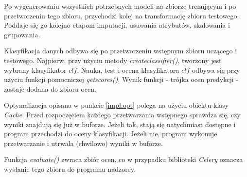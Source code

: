 \documentclass[../thesis.tex]{subfiles}
\begin{document}
Po wygenerowaniu wszystkich potrzebnych modeli na zbiorze trenującym i po przetworzeniu tego zbioru, przychodzi kolej na transformację zbioru testowego. Poddaje się go kolejno etapom imputacji, usuwania atrybutów, skalowania i grupowania.

Klasyfikacja danych odbywa się po przetworzeniu wstępnym zbioru uczącego i testowego. Najpierw, przy użyciu metody \emph{create\textunderscore classifier()}, tworzony jest wybrany klasyfikator $clf$. Nauka, test i ocena klasyfikatora $clf$ odbywa się przy użyciu funkcji pomocniczej \emph{get\textunderscore scores()}. Wynik funkcji - trójka ocen predykcji - zostaje dodana do zbioru ocen.

Optymalizacja opisana w punkcie \ref{impl:opt} polega na użyciu obiektu klasy \emph{Cache}. Przed rozpoczęciem każdego przetwarzania wstępnego sprawdza się, czy wyniki znajdują się już w buforze. Jeżeli tak, stają się natychmiast dostępne i program przechodzi do oceny klasyfikacji. Jeżeli nie, program wykonuje przetwarzanie i utrwala (chwilowo) wyniki w buforze.

Funkcja \emph{evaluate()} zwraca zbiór ocen, co w przypadku biblioteki \emph{Celery} oznacza wysłanie tego zbioru do programu-nadzorcy.
\end{document}
